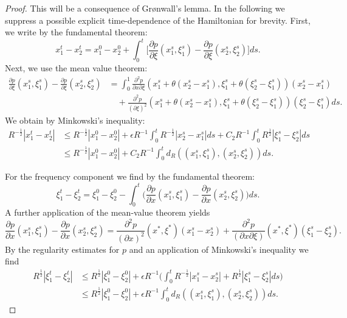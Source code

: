 \documentclass{amsart}
\theoremstyle{definition}
\begin{document}
\begin{proof}
This will be a consequence of Gr\o nwall's lemma. In the following we suppress a possible explicit time-dependence of the Hamiltonian for brevity. First, we write by the fundamental theorem:
\begin{equation*}
    x_1^t-x_2^t = x_1^0 - x_2^0 + \int_0^t \big[ \frac{\partial p}{\partial \xi}(x_1^s,\xi_1^s) - \frac{\partial p}{\partial \xi}(x_2^s,\xi_2^s) \big] ds .
\end{equation*}
Next, we use the mean value theorem:
\begin{equation*}
\begin{split}
    \frac{\partial p}{\partial \xi}(x_1^s,\xi_1^s) - \frac{\partial p}{\partial \xi}(x_2^s,\xi_2^s) &= \int_0^1 \frac{\partial^2 p}{\partial x \partial \xi}(x^s_1 + \theta(x_2^s - x_1^s), \xi_1^s + \theta (\xi_2^s - \xi_1^s)) (x_2^s - x_1^s) \\
    &\quad + \frac{\partial^2 p}{(\partial \xi)^2}(x_1^s+\theta(x_2^s-x_1^s),\xi_1^s + \theta(\xi_2^s - \xi_1^s)) (\xi_2^s - \xi_1^s) ds.
\end{split}
\end{equation*}
We obtain by Minkowski's inequality:
\begin{equation*}
    \begin{split}
    R^{-\frac{1}{2}}|x_1^t-x_2^t| &\leq R^{-\frac{1}{2}} |x_1^0 - x_2^0| + \epsilon R^{-1} \int_0^t R^{-\frac{1}{2}} |x_2^s - x_1^s| ds + C_2 R^{-1} \int_0^t R^{\frac{1}{2}} |\xi_1^s - \xi_2^s| ds \\
    &\leq R^{-\frac{1}{2}} |x_1^0 - x_2^0| + C_2 R^{-1} \int_0^t d_R((x_1^s,\xi_1^s),(x_2^s,\xi_2^s)) ds.
    \end{split}
\end{equation*}

For the frequency component we find by the fundamental theorem:
\begin{equation*}
\xi_1^t - \xi_2^t = \xi_1^0 - \xi_2^0 - \int_0^t \big( \frac{\partial p}{\partial x}(x_1^s,\xi_1^s) - \frac{\partial p}{\partial x}(x_2^s,\xi_2^s) \big) ds.
\end{equation*}
A further application of the mean-value theorem yields
\begin{equation*}
\frac{\partial p}{\partial x}(x_1^s,\xi_1^s) - \frac{\partial p}{\partial x}(x_2^s,\xi_2^s) = \frac{\partial^2 p}{(\partial x)^2}(x^*,\xi^*) (x_1^s - x_2^s) + \frac{\partial^2 p}{(\partial x \partial \xi)}(x^*,\xi^*) (\xi_1^s - \xi_2^s).
\end{equation*}
By the regularity estimates for $p$ and an application of Minkowski's inequality we find
\begin{equation*}
\begin{split}
R^{\frac{1}{2}} |\xi_1^t - \xi_2^t| &\leq R^{\frac{1}{2}} |\xi_1^0 - \xi_2^0|+ \epsilon R^{-1} \big( \int_0^t R^{-\frac{1}{2}} |x_1^s - x_2^s| + R^{\frac{1}{2}} |\xi_1^s - \xi_2^s| ds \big) \\
&\leq R^{\frac{1}{2}} |\xi_1^0 - \xi_2^0|+ \epsilon R^{-1} \int_0^t d_R((x_1^s,\xi_1^s),(x_2^s,\xi_2^s)) ds.
\end{split}
\end{equation*}


\end{proof}
\end{document}
